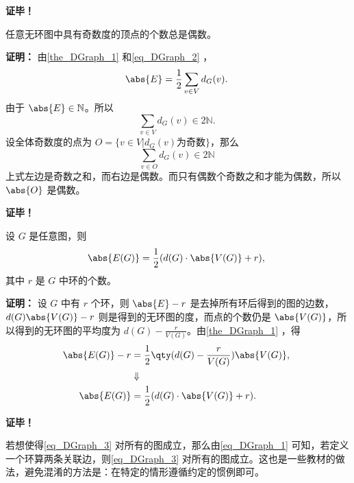 \textbf{证毕！}

\begin{corollary}{}
任意无环图中具有奇数度的顶点的个数总是偶数。
\end{corollary}
\textbf{证明：}
由\autoref{the_DGraph_1} 和\autoref{eq_DGraph_2} ，
\begin{equation}
\abs{E}=\frac{1}{2}\sum_{v\in V}d_G(v).~
\end{equation}
由于 $\abs{E}\in\mathbb N$。所以 
\begin{equation}
\sum_{v\in V}d_G(v)\in 2\mathbb N.~
\end{equation}
设全体奇数度的点为 $O=\{v\in V|d_G(v)\text{为奇数}\}$，那么
\begin{equation}
\sum_{v\in O}d_G(v)\in 2\mathbb N~
\end{equation}
上式左边是奇数之和，而右边是偶数。而只有偶数个奇数之和才能为偶数，所以 $\abs{O}$ 是偶数。

\textbf{证毕！}

\begin{corollary}{}
设 $G$ 是任意图，则
\begin{equation}
\abs{E(G)}=\frac{1}{2}(d(G)\cdot\abs{V(G)}+r),~
\end{equation}
其中 $r$ 是 $G$ 中环的个数。
\end{corollary}

\textbf{证明：}
设 $G$ 中有 $r$ 个环，则 $\abs{E}-r$ 是去掉所有环后得到的图的边数，$d(G)\abs{V(G)}-r$ 则是得到的无环图的度，而点的个数仍是 $\abs{V(G)}$，所以得到的无环图的平均度为 $d(G)-\frac{r}{V(G)}$。由\autoref{the_DGraph_1} ，得
\begin{equation}
\begin{aligned}
\abs{E(G)}-r&=\frac{1}{2}\qty(d(G)-\frac{r}{V(G)})\abs{V(G)},\\
&\Downarrow\\
\abs{E(G)}&=\frac{1}{2}(d(G)\cdot\abs{V(G)}+r).
\end{aligned}~
\end{equation}

\textbf{证毕！}

若想使得\autoref{eq_DGraph_3} 对所有的图成立，那么由\autoref{eq_DGraph_1} 可知，若定义一个环算两条关联边，则\autoref{eq_DGraph_3} 对所有的图成立。这也是一些教材的做法，避免混淆的方法是：在特定的情形遵循约定的惯例即可。









